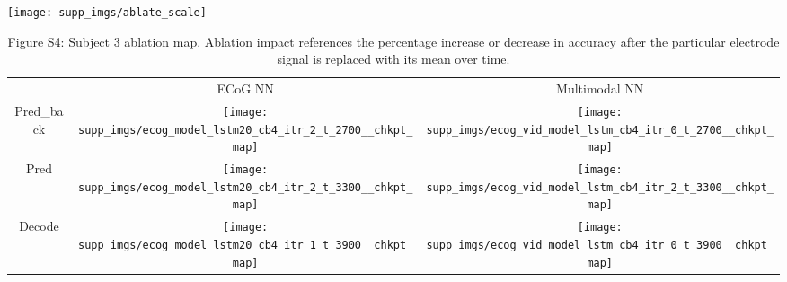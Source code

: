\documentclass{article}
\begin{document}
\centering
\texttt{[image: supp\_imgs/ablate\_scale]}
\begin{table}[h!]
  \centering
  \begin{adjustbox}{max width=\textwidth}
  \begin{tabular}{  c  c  c  }
    
     & ECoG NN & Multimodal NN \\ 
    Pred\_back &
    \begin{minipage}{.55\textwidth}
      \texttt{[image: supp\_imgs/ecog\_model\_lstm20\_cb4\_itr\_2\_t\_2700\_\_chkpt\_map]}
    \end{minipage}
    & 
    \begin{minipage}{.55\textwidth}
      \texttt{[image: supp\_imgs/ecog\_vid\_model\_lstm\_cb4\_itr\_0\_t\_2700\_\_chkpt\_map]}
    \end{minipage} \\ 
    
        Pred & 
    \begin{minipage}{.55\textwidth}
      \texttt{[image: supp\_imgs/ecog\_model\_lstm20\_cb4\_itr\_2\_t\_3300\_\_chkpt\_map]}
    \end{minipage}
    &
    \begin{minipage}{.55\textwidth}
      \texttt{[image: supp\_imgs/ecog\_vid\_model\_lstm\_cb4\_itr\_2\_t\_3300\_\_chkpt\_map]}
    \end{minipage} \\ 
    
        Decode &
    \begin{minipage}{.55\textwidth}
      \texttt{[image: supp\_imgs/ecog\_model\_lstm20\_cb4\_itr\_1\_t\_3900\_\_chkpt\_map]}
    \end{minipage}
    &
    \begin{minipage}{.55\textwidth}
      \texttt{[image: supp\_imgs/ecog\_vid\_model\_lstm\_cb4\_itr\_0\_t\_3900\_\_chkpt\_map]}
    \end{minipage} \\ 
  \end{tabular}
  \end{adjustbox}
  \caption*{Figure S4: Subject 3 ablation map. Ablation impact references the percentage increase or decrease in accuracy after the particular electrode signal is replaced with its mean over time.}\label{tbl:s3_ablate}
\end{table}
\newpage
\end{document}
